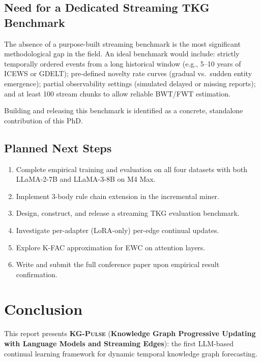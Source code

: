 \documentclass[10pt,a4paper,twocolumn]{article}
\theoremstyle{definition}
\newcommand{\ourmodel}{\textsc{KG-Pulse}}
\newcommand{\ourfull}{Knowledge Graph Progressive Updating with Language Models and Streaming Edges}
\begin{document}
\subsection{Need for a Dedicated Streaming TKG Benchmark}

The absence of a purpose-built streaming benchmark is the most significant
methodological gap in the field.
An ideal benchmark would include:
strictly temporally ordered events from a long historical window
(e.g., 5--10 years of ICEWS or GDELT);
pre-defined novelty rate curves (gradual vs.\ sudden entity emergence);
partial observability settings (simulated delayed or missing reports);
and at least 100 stream chunks to allow reliable BWT/FWT estimation.

Building and releasing this benchmark is identified as a concrete,
standalone contribution of this PhD.

\subsection{Planned Next Steps}

\begin{enumerate}[leftmargin=1.5em,itemsep=2pt,topsep=2pt]
  \item Complete empirical training and evaluation on all four datasets
        with both LLaMA-2-7B and LLaMA-3-8B on M4 Max.
  \item Implement 3-body rule chain extension in the incremental miner.
  \item Design, construct, and release a streaming TKG evaluation benchmark.
  \item Investigate per-adapter (LoRA-only) per-edge continual updates.
  \item Explore K-FAC approximation for EWC on attention layers.
  \item Write and submit the full conference paper upon empirical result
        confirmation.
\end{enumerate}

\section{Conclusion}
\label{sec:conclusion}

This report presents \textbf{\ourmodel{}} (\textbf{\ourfull{}}):
the first LLM-based continual learning framework for dynamic temporal
knowledge graph forecasting.
\end{document}
